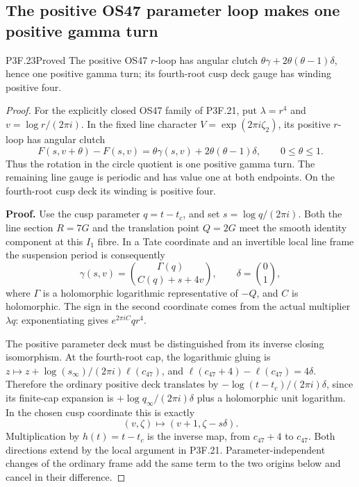 \subsection{The positive OS47 parameter loop makes one positive gamma turn}
\begin{statement}{P3F.23}{Proved}
The positive OS47 $r$-loop has angular clutch $\theta\gamma+2\theta(\theta-1)\delta$, hence one positive gamma turn; its fourth-root cusp deck gauge has winding positive four.
\end{statement}
\begin{proof}
For the explicitly closed OS47 family of P3F.21, put \(\lambda=r^4\) and \(v=\log r/(2\pi i)\). In the fixed line character \(V=\exp(2\pi i\zeta _2)\), its positive \(r\)-loop has angular clutch \[
 F(s,v+\theta)-F(s,v)
    =\theta\gamma(s,v)+2\theta(\theta-1)\delta,
 \qquad 0\leq\theta\leq1.                         \tag{P3F.23.1}
\] Thus the rotation in the circle quotient is one positive gamma turn. The remaining line gauge is periodic and has value one at both endpoints. On the fourth-root cusp deck its winding is positive four.

\textbf{Proof.} Use the cusp parameter \(q=t-t_c\), and set \(s=\log q/(2\pi i)\). Both the line section \(R=7G\) and the translation point \(Q=2G\) meet the smooth identity component at this \(I_1\) fibre. In a Tate coordinate and an invertible local line frame the suspension period is consequently \[
 \gamma(s,v)=\binom{\Gamma(q)}{C(q)+s+4v},\qquad
 \delta=\binom01,
\] where \(\Gamma\) is a holomorphic logarithmic representative of \(-Q\), and \(C\) is holomorphic. The sign in the second coordinate comes from the actual multiplier \(\lambda q\): exponentiating gives \(e^{2\pi iC}q r^4\).

The positive parameter deck must be distinguished from its inverse closing isomorphism. At the fourth-root cap, the logarithmic gluing is \(z\mapsto z+\log(s_\infty)/(2\pi i)\ell(c_{47})\), and \(\ell(c_{47}+4)-\ell(c_{47})=4\delta\). Therefore the ordinary positive deck translates by \(-\log(t-t_c)/(2\pi i)\delta\), since its finite-cap expansion is \(+\log q_\infty/(2\pi i)\delta\) plus a holomorphic unit logarithm. In the chosen cusp coordinate this is exactly \[
 (v,\zeta)\longmapsto(v+1,\zeta-s\delta).          \tag{P3F.23.2}
\] Multiplication by \(h(t)=t-t_c\) is the inverse map, from \(c_{47}+4\) to \(c_{47}\). Both directions extend by the local argument in P3F.21. Parameter-independent changes of the ordinary frame add the same term to the two origins below and cancel in their difference.


\end{proof}

